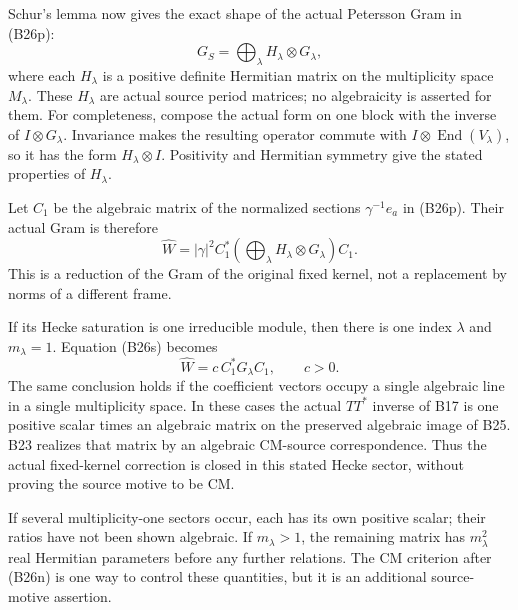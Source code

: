 Schur's lemma now gives the exact shape of the actual
Petersson Gram in (B26p):
\[
                   G_S=\bigoplus_\lambda
                                  H_\lambda\otimes G_\lambda,
 \tag{B26r}
\]
where each $H_\lambda$ is a positive definite Hermitian
matrix on the multiplicity space $M_\lambda$.  These
$H_\lambda$ are actual source period matrices; no
algebraicity is asserted for them.  For completeness,
compose the actual form on one block with the inverse
of $I\otimes G_\lambda$.  Invariance makes the resulting
operator commute with $I\otimes\operatorname{End}(V_\lambda)$,
so it has the form $H_\lambda\otimes I$.  Positivity and
Hermitian symmetry give the stated properties of
$H_\lambda$.

Let $C_1$ be the algebraic matrix of the normalized
sections $\gamma^{-1}e_a$ in (B26p).  Their actual Gram
is therefore
\[
       \widehat W=|\gamma|^2 C_1^*
          \left(\bigoplus_\lambda H_\lambda\otimes G_\lambda\right)
                                  C_1.
 \tag{B26s}
\]
This is a reduction of the Gram of the original fixed
kernel, not a replacement by norms of a different frame.

If its Hecke saturation is one irreducible module, then
there is one index $\lambda$ and $m_\lambda=1$.
Equation (B26s) becomes
\[
                 \widehat W=c\,C_1^*G_\lambda C_1,
                         \qquad c>0.
 \tag{B26t}
\]
The same conclusion holds if the coefficient vectors
occupy a single algebraic line in a single multiplicity
space.  In these cases the actual $TT^*$ inverse of B17
is one positive scalar times an algebraic matrix on
the preserved algebraic image of B25.  B23 realizes that
matrix by an algebraic CM-source correspondence.  Thus
the actual fixed-kernel correction is closed in this
stated Hecke sector, without proving the source motive
to be CM.

If several multiplicity-one sectors occur, each has its
own positive scalar; their ratios have not been shown
algebraic.  If $m_\lambda>1$, the remaining matrix has
$m_\lambda^2$ real Hermitian parameters before any further
relations.  The CM criterion after (B26n) is one way to
control these quantities, but it is an additional
source-motive assertion.

